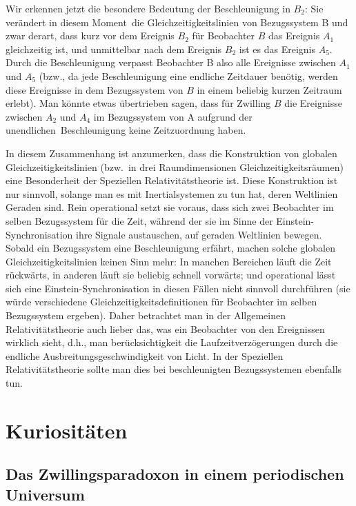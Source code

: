Wir erkennen jetzt die besondere Bedeutung der Beschleunigung in $B_2$: Sie ver\"andert
in diesem \glqq Moment\grqq\ die Gleichzeitigkeitslinien von Bezugssystem B und zwar derart,
dass kurz vor dem Ereignis $B_2$ f\"ur Beobachter $B$ das Ereignis $A_1$ gleichzeitig ist,
und unmittelbar nach dem Ereignis $B_2$ ist es das Ereignis $A_5$. Durch die Beschleunigung verpasst
Beobachter B also alle Ereignisse zwischen $A_1$ und $A_5$ (bzw., da jede Beschleunigung
eine endliche Zeitdauer ben\"otig, werden diese Ereignisse in dem Bezugssystem von $B$
in einem beliebig kurzen Zeitraum
\glqq erlebt\grqq). Man k\"onnte etwas \"ubertrieben sagen, dass f\"ur Zwilling $B$ die Ereignisse zwischen 
$A_2$ und $A_4$ im Bezugssystem von A  aufgrund der \glqq unendlichen\grqq\
Beschleunigung keine Zeitzuordnung haben. 

In diesem Zusammenhang ist anzumerken, dass die Konstruktion von globalen Gleichzeitigkeitslinien
(bzw.\ in drei Raumdimensionen \glqq Gleichzeitigkeitsr\"aumen\grqq) eine Besonderheit der
Speziellen Relativit\"atstheorie ist. Diese Konstruktion ist nur sinnvoll, solange man es mit
Inertialsystemen zu tun hat, deren Weltlinien Geraden sind. Rein operational setzt sie voraus,
dass sich zwei Beobachter im selben Bezugssystem f\"ur die Zeit, w\"ahrend der sie im
Sinne der Einstein-Synchronisation\index{Einstein-Synchronisation} 
ihre Signale austauschen, auf geraden Weltlinien bewegen. 
Sobald ein Bezugssystem eine Beschleunigung erf\"ahrt, machen solche globalen Gleichzeitigkeitslinien
keinen Sinn mehr: In manchen Bereichen l\"auft die Zeit r\"uckw\"arts, in anderen l\"auft sie
beliebig schnell vorw\"arts; und operational l\"asst sich eine Einstein-Synchronisation in diesen
F\"allen nicht sinnvoll durchf\"uhren (sie w\"urde verschiedene Gleichzeitigkeitsdefinitionen
f\"ur Beobachter im selben Bezugs\-sys\-tem ergeben). Daher betrachtet man in der Allgemeinen
Relativit\"atstheorie auch lieber das, was ein Beobachter von den Ereignissen wirklich sieht, d.h.,
man ber\"ucksichtigkeit die Laufzeitverz\"ogerungen durch die endliche Ausbreitungsgeschwindigkeit
von Licht. In der Speziellen Relativit\"atstheorie sollte man dies bei beschleunigten Bezugssystemen
ebenfalls tun. 
 
\section{Kuriosit\"aten}
 
\subsection{Das Zwillingsparadoxon in einem periodischen Universum}

